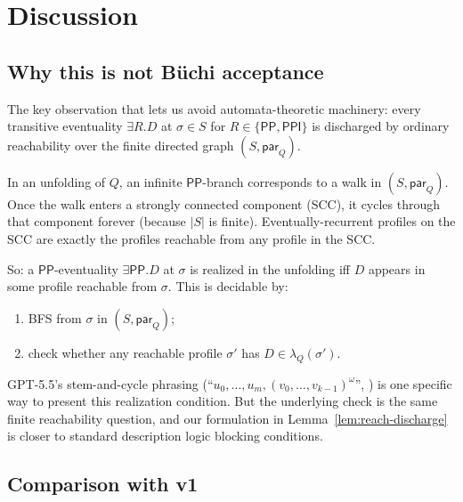 \documentclass[11pt]{article}
\theoremstyle{definition}
\theoremstyle{remark}
\newcommand{\PP}{\mathsf{PP}}
\newcommand{\PPI}{\mathsf{PPI}}
\begin{document}
\section{Discussion}
\label{sec:discussion}

\subsection{Why this is not B\"uchi acceptance}

The key observation that lets us avoid automata-theoretic
machinery: every transitive eventuality $\exists R.D$ at $\sigma
\in S$ for $R \in \{\PP, \PPI\}$ is discharged by ordinary
reachability over the finite directed graph $(S,
\mathsf{par}_Q)$.

In an unfolding of $Q$, an infinite $\PP$-branch corresponds to a
walk in $(S, \mathsf{par}_Q)$.  Once the walk enters a strongly
connected component (SCC), it cycles through that component
forever (because $|S|$ is finite).  Eventually-recurrent profiles
on the SCC are exactly the profiles reachable from any profile in
the SCC.

So: a $\PP$-eventuality $\exists\PP.D$ at $\sigma$ is realized in
the unfolding iff $D$ appears in some profile reachable from
$\sigma$.  This is decidable by:
\begin{enumerate}
\item BFS from $\sigma$ in $(S, \mathsf{par}_Q)$;
\item check whether any reachable profile $\sigma'$ has $D \in
  \lambda_Q(\sigma')$.
\end{enumerate}

GPT-5.5's stem-and-cycle phrasing
(``$u_0,\ldots,u_m,(v_0,\ldots,v_{k-1})^\omega$'',
\cite[Definition~6.4]{GPT55Generated}) is one specific way to
present this realization condition.  But the underlying check is
the same finite reachability question, and our formulation in
Lemma~\ref{lem:reach-discharge} is closer to standard description
logic blocking conditions.

\subsection{Comparison with v1}
\end{document}

